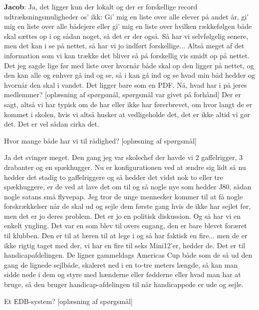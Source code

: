 \textbf{Jacob}: Ja, det ligger kun der lokalt og der er forskellige record udtræksningsmuligheder os' ikk: Gi' mig en liste over alle elever på andet år, gi' mig en liste over alle bådejere eller gi' mig en liste over hvilken rækkefølgen både skal sættes op i og sådan noget, så det er der også. Så har vi selvfølgelig senere, men det kan i se på nettet, så har vi jo indført forskellige... Altså meget af det information som vi kan trække det bliver så på forskellig vis smidt op på nettet. Det jeg sagde lige før med liste over hvornår både skal op den ligger på nettet, og den kan alle og enhver gå ind og se, så i kan gå ind og se hvad min båd hedder og hvornår den skal i vandet. Det ligger bare som en PDF. 
Nå, hvad har i på jeres medlemmer? [oplæsning af spørgsmål, spørgsmål var givet på forhånd] Der er sagt, altså vi har typisk om de har eller ikke har førerbrevet, om hvor langt de er kommet i skolen, hvis vi altså husker at vedligeholde det, det er ikke altid vi gør det. Det er vel sådan cirka det. 

Hvor mange både har vi til rådighed? [oplæsning af spørgsmål]

Ja det svinger meget. Den gang jeg var skolechef der havde vi 2 gaffelrigger, 3 drabanter og en spækhugger. Nu er konfigurationen ved at ændre sig lidt så nu hedder det stadig to gaffelriggere og så hedder det vidst nok to eller tre spækhuggere, er de ved at lave det om til og så nogle nye som hedder J80, sådan nogle satans små flyvepap. Jeg tror de unge mennesker kommer til at få nogle forskrækkelser når de skal ud og sejle dem første gang hvis de ikke har sejlet før, men det er jo deres problem. Det er jo en politisk diskussion. Og så har vi en enkelt yngling. Det var en som blev til overs engang, den er bare blevet foræret til klubben. Den er til at læren til at lege i og så har faktisk en fire... men de er ikke rigtig taget med der, vi har en fire til seks Mini12'er, hedder de. Det er til handicapafdelingen. De ligner gammeldags Americas Cup både som de så ud den gang de lignede sejlbåde, skaleret ned i en to-tre meters længde, så kan man sidde nede i dem og styre med hænderne eller fødderne eller hvad man har at bruge, så den bruger handicap-afdelingen til når handicappede er ude og sejle. 

Et EDB-system? [oplæsning af spørgsmål]

